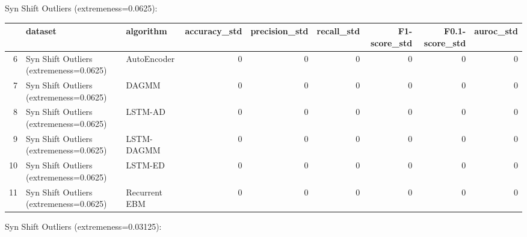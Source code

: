 Syn Shift Outliers (extremeness=0.0625):

\begin{tabular}{rllrrrrrr}
\hline
    & dataset                                 & algorithm     &   accuracy\_std &   precision\_std &   recall\_std &   F1-score\_std &   F0.1-score\_std &   auroc\_std \\
\hline
  6 & Syn Shift Outliers (extremeness=0.0625) & AutoEncoder   &              0 &               0 &            0 &              0 &                0 &           0 \\
  7 & Syn Shift Outliers (extremeness=0.0625) & DAGMM         &              0 &               0 &            0 &              0 &                0 &           0 \\
  8 & Syn Shift Outliers (extremeness=0.0625) & LSTM-AD       &              0 &               0 &            0 &              0 &                0 &           0 \\
  9 & Syn Shift Outliers (extremeness=0.0625) & LSTM-DAGMM    &              0 &               0 &            0 &              0 &                0 &           0 \\
 10 & Syn Shift Outliers (extremeness=0.0625) & LSTM-ED       &              0 &               0 &            0 &              0 &                0 &           0 \\
 11 & Syn Shift Outliers (extremeness=0.0625) & Recurrent EBM &              0 &               0 &            0 &              0 &                0 &           0 \\
\hline
\end{tabular}

Syn Shift Outliers (extremeness=0.03125):

